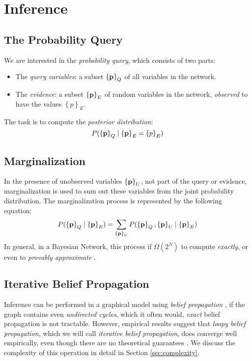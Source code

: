 \documentclass[11pt]{article}
\newcommand{\pvariable}{{\bf p}}
\newcommand{\pvariableset}{\left\{\pvariable\right\}}
\begin{document}
\section{Inference}
\label{sec:inference}
\subsection{The Probability Query}
We are interested in the \textit{probability query}, which consists of two parts:
\begin{itemize}
    \item The {\em query variables}: a subset \( \pvariableset_Q \) of all variables in the network.
    \item The {\em evidence}: a subset \( \pvariableset_E \) of random variables in the network, {\em observed} to have the values \( \left\{p\right\}_E\).
\end{itemize}
The task is to compute the {\em posterior distribution}:
\begin{equation}
    P( \pvariableset_Q \mid \pvariableset_E = \left\{p\right\}_E)
\end{equation}

\subsection{Marginalization}
In the presence of unobserved variables \( \pvariableset_U \), not part of the query or evidence, marginalization is used to sum out these variables from the joint probability distribution. The marginalization process is represented by the following equation:
\begin{equation}
    P(\pvariableset_Q \mid \pvariableset_E) = \sum_{\pvariableset_U} P(\pvariableset_Q, \pvariableset_U \mid \pvariableset_E)
\end{equation}
In general, in a Bayesian Network, this process if $\Omega(2^N)$ to compute {\em exactly}, or even to {\em provably approximate} \cite{Cooper1990,Roth1996HardnessApproxReasoning}.

\subsection{Iterative Belief Propagation}
Inference can be performed in a graphical model using {\em belief propagation} \cite{koller2009probabilistic,neapolitan2003learning,bishop2006pattern}, if the graph contains even {\em undirected cycles}, which it often would, {\em exact} belief propagation is not tractable.
However, empirical results suggest that {\em loopy belief propagation}, which we will call {\em iterative belief propagation}, does converge well empirically, even though there are no theoretical guarantees \cite{Murphy2013, Smith2008}.
We discuss the complexity of this operation in detail in Section \ref{sec:complexity}.
\end{document}
